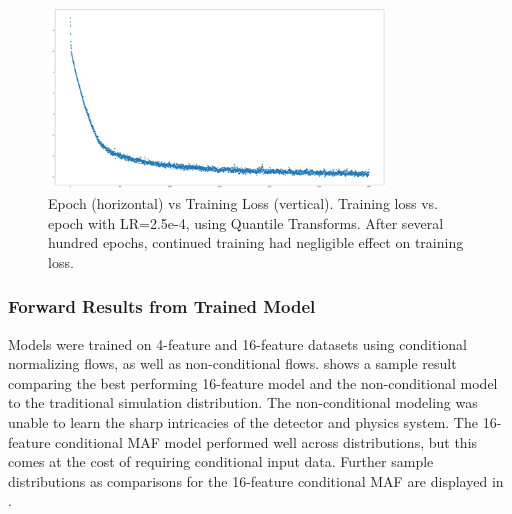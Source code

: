         \begin{figure}[H]
            \centering
            \includegraphics[width = 0.8\textwidth]{Chapters/Ch3-Simulations/normalizing_flows/pics/MeetingFigures/Bobby/LearningRate/learning_rate_25e-5_with_QT.png}
            \caption[Training Loss vs. Epoch]{Epoch (horizontal) vs Training Loss (vertical). Training loss vs. epoch with LR=2.5e-4, using Quantile Transforms. After several hundred epochs, continued training had negligible effect on training loss. }
            \label{fig:jul8_pion_comparison4}
            
        \end{figure}
        


    
    
    \subsubsection{Forward Results from Trained Model}
        Models were trained on 4-feature and 16-feature datasets using conditional normalizing flows, as well as non-conditional flows.  shows a sample result comparing the best performing 16-feature model and the non-conditional model to the traditional simulation distribution. The non-conditional modeling was unable to learn the sharp intricacies of the detector and physics system. The 16-feature conditional MAF model performed well across distributions, but this comes at the cost of requiring conditional input data.  Further sample distributions as comparisons for the 16-feature conditional MAF are displayed in . 


